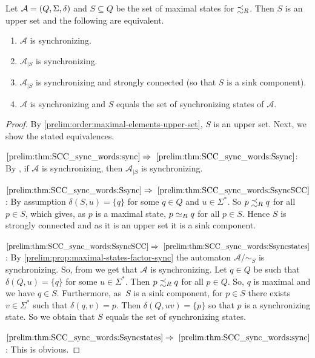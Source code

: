 \begin{theorem}
	\label{prelim:thm:SCC_sync_words}
	Let $\mathcal A = (Q, \Sigma, \delta)$ and $S \subseteq Q$ be the set of maximal states for $\precsim_R$.
	Then $S$ is an upper set and the following are equivalent.
	
	\begin{enumerate}
		\item \label{prelim:thm:SCC_sync_words:sync} $\mathcal A$ is synchronizing.
		
		\item \label{prelim:thm:SCC_sync_words:Ssync} $\mathcal A_{|S}$ is synchronizing.
		
		\item \label{prelim:thm:SCC_sync_words:SsyncSCC} $\mathcal A_{|S}$ is synchronizing and strongly connected (so that $S$ is a sink component).
		
		\item \label{prelim:thm:SCC_sync_words:Ssyncstates} $\mathcal A$ is synchronizing and $S$ equals the set of synchronizing states of $\mathcal A$.
	\end{enumerate}
\end{theorem}
\begin{proof} 
	By \cref{prelim:order:maximal-elements-upper-set}, $S$ is an upper set. Next, we show the stated equivalences.	
	
	$\ref{prelim:thm:SCC_sync_words:sync} \Rightarrow~\ref{prelim:thm:SCC_sync_words:Ssync}$: By , 
	if $\mathcal A$ is synchronizing, then $\mathcal A_{|S}$
	is synchronizing.	
		
	$\ref{prelim:thm:SCC_sync_words:Ssync} \Rightarrow~\ref{prelim:thm:SCC_sync_words:SsyncSCC}$: 
	By assumption $\delta(S, u) = \{q\}$ for some $q \in Q$ and $u \in \Sigma^*$.
	So $p \precsim_R q$ for all $p \in S$,
	which gives, as $p$ is a maximal state, $p \simeq_R q$ for all $p \in S$.
	Hence $S$ is strongly connected and as it is an upper set
	it is a sink component.
	
	$\ref{prelim:thm:SCC_sync_words:SsyncSCC} \Rightarrow~\ref{prelim:thm:SCC_sync_words:Ssyncstates}$: 
	By \cref{prelim:prop:maximal-states-factor-sync}
	the automaton $\mathcal A / {\sim_S}$ is synchronizing.
	So, from 
	we get that $\mathcal A$ is synchronizing.
	Let $q \in Q$ be such that $\delta(Q, u) = \{q\}$ for some $u \in \Sigma^*$.
	Then $p \precsim_R q$ for all $p \in Q$. So, $q$ is maximal and we have $q \in S$.
	Furthermore, as~$S$ is a sink component, for $p \in S$
	there exists $v \in \Sigma^*$ such that $\delta(q, v) = p$.
	Then $\delta(Q, uv) = \{p\}$ so that $p$ is a synchronizing state.
	So we obtain that $S$ equals the set of synchronizing states.			
	
	$\ref{prelim:thm:SCC_sync_words:Ssyncstates} \Rightarrow~\ref{prelim:thm:SCC_sync_words:sync}$: This is obvious.
\end{proof}

